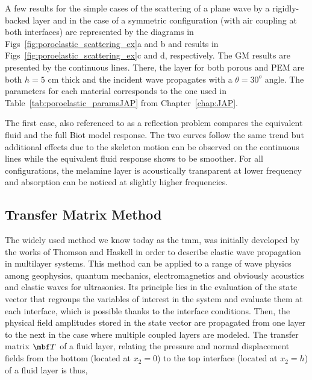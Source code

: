 A few results for the simple cases of the scattering of a plane wave by a rigidly-backed layer and in the case of a symmetric configuration (with air coupling at both interfaces) are represented by the diagrams in Figs~\ref{fig:poroelastic_scattering_ex}a and b and results in Figs~\ref{fig:poroelastic_scattering_ex}c and d, respectively. The GM results are presented by the continuous lines. There, the layer for both porous and PEM are both $h=5$ cm thick and the incident wave propagates with a $\theta=30^o$ angle. The parameters for each material corresponds to the one used in Table~\ref{tab:poroelastic_paramsJAP} from Chapter~\ref{chap:JAP}.

The first case, also referenced to as a reflection problem compares the equivalent fluid and the full Biot model response. The two curves follow the same trend but additional effects due to the skeleton motion can be observed on the continuous lines while the equivalent fluid response shows to be smoother. For all configurations, the melamine layer is acoustically transparent at lower frequency and absorption can be noticed at slightly higher frequencies. 


\subsection{Transfer Matrix Method}
The widely used method we know today as the \acrfull{tmm}, was initially developed by the works of Thomson \cite{thomson1950} and Haskell \cite{haskell1953} in order to describe elastic wave propagation in multilayer systems. This method can be applied to a range of wave physics among geophysics, quantum mechanics, electromagnetics and obviously acoustics \cite{bruneau2006, markos2008,jimenez2021} and elastic waves for ultrasonics\cite{lowe1995}. Its principle lies in the evaluation of the state vector that regroups the variables of interest in the system and evaluate them at each interface, which is possible thanks to the interface conditions. Then, the physical field amplitudes stored in the state vector are propagated from one layer to the next in the case where multiple coupled layers are modeled. The transfer matrix $\mbf T$ of a fluid layer, relating the pressure and normal displacement fields from the bottom (located at $x_2 = 0$) to the top interface (located at $x_2 = h$) of a fluid layer is thus, \cite{bruneau2006}

